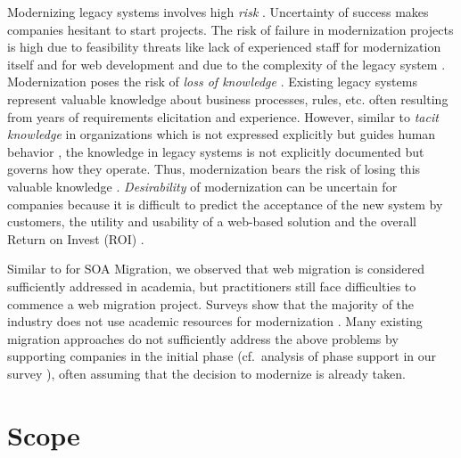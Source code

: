 Modernizing legacy systems involves high \emph{risk} \autocite{ISO/IEEE24765Vocabulary,Khadka2014ProfessionalsModernization,Canfora2000Decomposing,Bisbal1999LegacyInformationSystems,Seacord2003ModernizingLS,Heil2018ReWaMP}.
Uncertainty of success makes companies hesitant to start projects.
The risk of failure in modernization projects is high \autocite{Gartner2014ModernizationFailure,ForresterResearch2011Modernization} due to feasibility threats like lack of experienced staff for modernization itself \autocite{Sneed2010SoftwareMigration,Seacord2003ModernizingLS} and for web development and due to the complexity of the legacy system \autocite{Khadka2014ProfessionalsModernization}.
Modernization poses the risk of \emph{loss of knowledge} \autocite{Khadka2014ProfessionalsModernization}.
Existing legacy systems represent valuable knowledge about business processes, rules, etc.
\autocite{Aversano2001,Sneed2010SoftwareMigration,Wagner2014Fundamentals} often resulting from years of requirements elicitation and experience.
However, similar to \emph{tacit knowledge} in organizations which is not expressed explicitly but guides human behavior \autocite{Nonaka2008TacitKnowledge}, the knowledge in legacy systems is not explicitly documented but governs how they operate.
Thus, modernization bears the risk of losing this valuable knowledge \autocite{Khadka2014ProfessionalsModernization}.
\emph{Desirability} of modernization can be uncertain for companies because it is difficult to predict the acceptance of the new system by customers, the utility and usability of a web-based solution and the overall Return on Invest (ROI) \autocite{Khadka2014ProfessionalsModernization}.

Similar to \autocite{Razavian2013PHD} for SOA Migration, we observed that web migration is considered sufficiently addressed in academia, but practitioners still face difficulties to commence a web migration project.
Surveys show that the majority of the industry does not use academic resources for modernization \autocite{Batlajery2014IndustrialSurveyModernization}.
Many existing migration approaches do not sufficiently address the above problems by supporting companies in the initial phase (cf.~analysis of phase support in our survey \autocite{Heil2017Survey}), often assuming that the decision to modernize is already taken.

\hypertarget{sec:scope}{%
\section{Scope}\label{sec:scope}}

